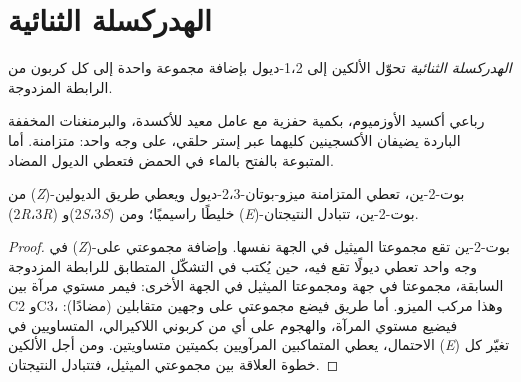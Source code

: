 \section{الهدركسلة الثنائية}

\begin{definition}\label{def:b2:alkene-redox:dihydroxylation}
\emph{الهدركسلة الثنائية} تحوّل الألكين إلى 1،2-ديول بإضافة
مجموعة  واحدة إلى كل كربون من الرابطة المزدوجة.
\end{definition}

رباعي أكسيد الأوزميوم، بكمية حفزية مع عامل معيد للأكسدة، والبرمنغنات المخففة الباردة يضيفان
الأكسجينين كليهما عبر إستر حلقي، على وجه واحد:  متزامنة. أما 
المتبوعة بالفتح بالماء في الحمض فتعطي الديول المضاد.

\begin{proposition}\label{prop:b2:alkene-redox:diols}
من (\textit{Z})-بوت-2-ين، تعطي  المتزامنة ميزو-بوتان-2،3-ديول ويعطي
طريق  الديولين (2\textit{R}،3\textit{R}) و(2\textit{S}،3\textit{S}) خليطًا راسيميًا؛ ومن
(\textit{E})-بوت-2-ين، تتبادل النتيجتان.
\end{proposition}

\begin{proof}
في (\textit{Z})-بوت-2-ين تقع مجموعتا الميثيل في الجهة نفسها. وإضافة مجموعتي  على وجه واحد
تعطي ديولًا تقع فيه، حين يُكتب في التشكّل المتطابق للرابطة المزدوجة السابقة،
مجموعتا  في جهة ومجموعتا الميثيل في الجهة الأخرى: فيمر مستوي مرآة بين
C2 وC3، وهذا مركب الميزو. أما طريق  فيضع مجموعتي  على وجهين متقابلين
(مضادًا): فيضيع مستوي المرآة، والهجوم على أي من كربوني  اللاكيرالي،
المتساويين في الاحتمال، يعطي المتماكبين المرآويين بكميتين متساويتين. ومن أجل الألكين (\textit{E}) تغيّر كل
خطوة العلاقة بين مجموعتي الميثيل، فتتبادل النتيجتان.
\end{proof}

